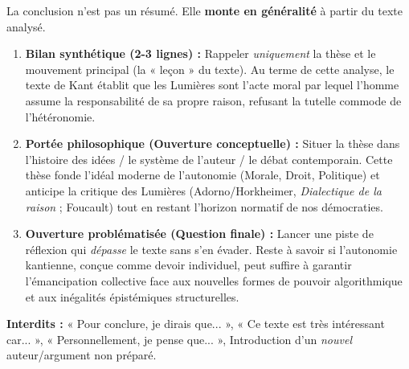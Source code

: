 \documentclass[11pt]{article}
\begin{document}
\begin{methode}
    La conclusion n'est pas un résumé. Elle \textbf{monte en généralité} à partir du texte analysé.
    \begin{enumerate}
        \item \textbf{Bilan synthétique (2-3 lignes) :} Rappeler \emph{uniquement} la thèse et le mouvement principal (la « leçon » du texte). \guillemotleft Au terme de cette analyse, le texte de Kant établit que les Lumières sont l'acte moral par lequel l'homme assume la responsabilité de sa propre raison, refusant la tutelle commode de l'hétéronomie. \guillemotright
        \item \textbf{Portée philosophique (Ouverture conceptuelle) :} Situer la thèse dans l'histoire des idées / le système de l'auteur / le débat contemporain. \guillemotleft Cette thèse fonde l'idéal moderne de l'autonomie (Morale, Droit, Politique) et anticipe la critique des Lumières (Adorno/Horkheimer, \emph{Dialectique de la raison} ; Foucault) tout en restant l'horizon normatif de nos démocraties. \guillemotright
        \item \textbf{Ouverture problématisée (Question finale) :} Lancer une piste de réflexion qui \emph{dépasse} le texte sans s'en évader. \guillemotleft Reste à savoir si l'autonomie kantienne, conçue comme devoir individuel, peut suffire à garantir l'émancipation collective face aux nouvelles formes de pouvoir algorithmique et aux inégalités épistémiques structurelles. \guillemotright
    \end{enumerate}
    \textbf{Interdits :} « Pour conclure, je dirais que... », « Ce texte est très intéressant car... », « Personnellement, je pense que... », Introduction d'un \emph{nouvel} auteur/argument non préparé.
\end{methode}
\end{document}
